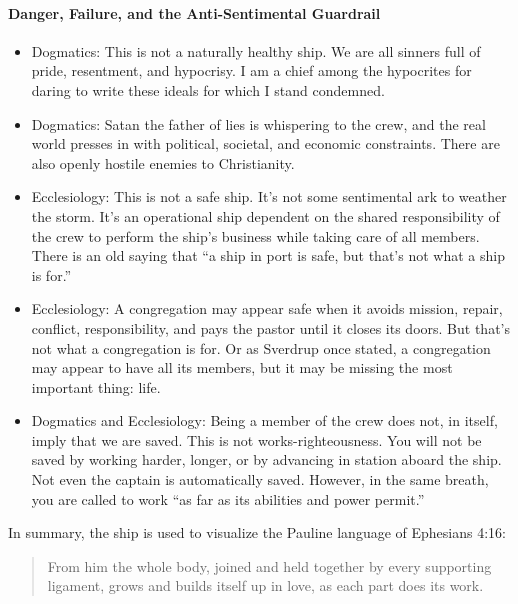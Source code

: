 \paragraph{Danger, Failure, and the Anti-Sentimental Guardrail}
\begin{itemize}

\item Dogmatics: This is not a naturally healthy ship. We are all sinners full of pride, resentment, and hypocrisy. I am a chief among the hypocrites for daring to write these ideals for which I stand condemned.

\item Dogmatics: Satan the father of lies is whispering to the crew, and the real world presses in with political, societal, and economic constraints. There are also openly hostile enemies to Christianity.

\item Ecclesiology: This is not a safe ship. It's not some sentimental ark to weather the storm. It's an operational ship dependent on the shared responsibility of the crew to perform the ship's business while taking care of all members. There is an old saying that ``a ship in port is safe, but that's not what a ship is for.''

\item Ecclesiology: A congregation may appear safe when it avoids mission, repair, conflict, responsibility, and pays the pastor until it closes its doors. But that's not what a congregation is for. Or as Sverdrup once stated, a congregation may appear to have all its members, but it may be missing the most important thing: life.


\item Dogmatics and Ecclesiology: Being a member of the crew does not, in itself, imply that we are saved. This is not works-righteousness. You will not be saved by working harder, longer, or by advancing in station aboard the ship. Not even the captain is automatically saved. However, in the same breath, you are called to work ``as far as its abilities and power permit.'' 

\end{itemize}


In summary, the ship is used to visualize the Pauline language of Ephesians 4:16:

\begin{quote}

From him the whole body, joined and held together by every supporting ligament, grows and builds itself up in love, as each part does its work.

\end{quote}

